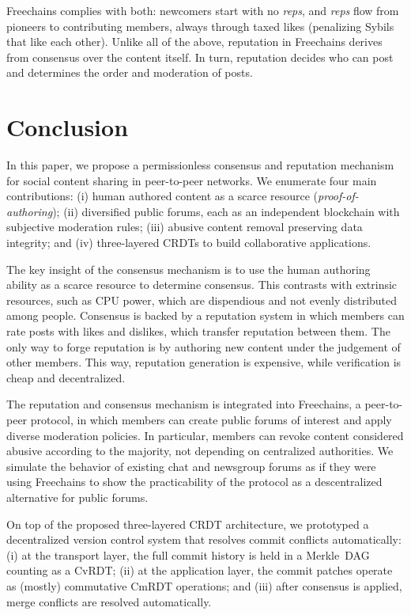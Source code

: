\documentclass[10pt,twocolumn]{article}
\newcommand{\FC}       {Freechains\xspace}
\newcommand{\reps}     {\emph{reps}\xspace}
\begin{document}
\FC complies with both:
    newcomers start with no \reps, and \reps flow from pioneers to
    contributing members, always through taxed likes (penalizing Sybils that
    like each other).
%
Unlike all of the above, reputation in \FC derives from consensus over the
content itself.
In turn, reputation decides who can post and determines the order and
moderation of posts.

\section{Conclusion}
\label{sec.conclusion}

\iffalse
In this paper, we propose a permissionless consensus and reputation mechanism
for social content sharing in peer-to-peer networks.
We enumerate four main contributions:
    (i)   human authored content as a scarce resource
          (\emph{proof-of-authoring});
    (ii)  diversified public forums, each as an independent blockchain with
          subjective moderation rules;
    (iii) abusive content removal preserving data integrity; and
    (iv)  three-layered CRDTs to build collaborative applications.

The key insight of the consensus mechanism is to use the human authoring
ability as a scarce resource to determine consensus.
This contrasts with extrinsic resources, such as CPU power, which are
dispendious and not evenly distributed among people.
%
Consensus is backed by a reputation system in which members can rate posts with
likes and dislikes, which transfer reputation between them.
The only way to forge reputation is by authoring new content under the
judgement of other members.
This way, reputation generation is expensive, while verification is cheap and
decentralized.

The reputation and consensus mechanism is integrated into \FC, a peer-to-peer
protocol, in which members can create public forums of interest and apply diverse
moderation policies.
In particular, members can revoke content considered abusive according to the
majority, not depending on centralized authorities.
%
We simulate the behavior of existing chat and newsgroup forums as if they were
using \FC to show the practicability of the protocol as a descentralized
alternative for public forums.

On top of the proposed three-layered CRDT architecture, we prototyped a
decentralized version control system that resolves commit conflicts
automatically:
    (i)   at the transport layer, the full commit history is held in a
          Merkle~DAG counting as a CvRDT;
    (ii)  at the application layer, the commit patches operate as (mostly)
          commutative CmRDT operations; and
    (iii) after consensus is applied, merge conflicts are resolved
          automatically.
\end{document}
